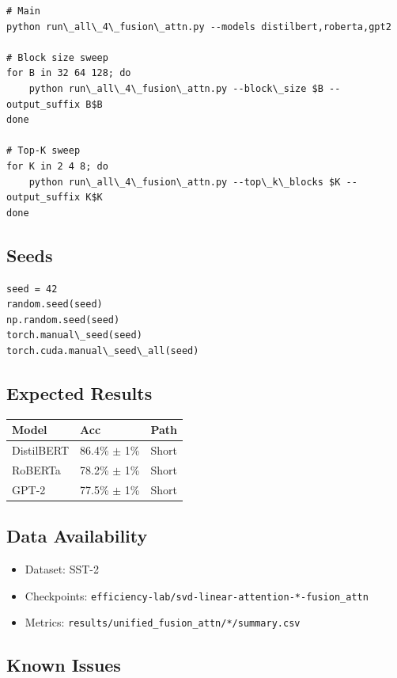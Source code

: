 \begin{lstlisting}
# Main
python run\_all\_4\_fusion\_attn.py --models distilbert,roberta,gpt2

# Block size sweep
for B in 32 64 128; do
    python run\_all\_4\_fusion\_attn.py --block\_size $B --output_suffix B$B
done

# Top-K sweep
for K in 2 4 8; do
    python run\_all\_4\_fusion\_attn.py --top\_k\_blocks $K --output_suffix K$K
done
\end{lstlisting}

\subsection{Seeds}

\begin{lstlisting}
seed = 42
random.seed(seed)
np.random.seed(seed)
torch.manual\_seed(seed)
torch.cuda.manual\_seed\_all(seed)
\end{lstlisting}

\subsection{Expected Results}

\begin{table}[H]
\centering
\small
\begin{tabular}{lll}
\toprule
\textbf{Model} & \textbf{Acc} & \textbf{Path} \\
\midrule
DistilBERT & 86.4\% $\pm$ 1\% & Short \\
RoBERTa & 78.2\% $\pm$ 1\% & Short \\
GPT-2 & 77.5\% $\pm$ 1\% & Short \\
\bottomrule
\end{tabular}
\end{table}

\subsection{Data Availability}

\begin{itemize}
\item Dataset: SST-2
\item Checkpoints: \texttt{efficiency-lab/svd-linear-attention-*-fusion\_attn}
\item Metrics: \texttt{results/unified\_fusion\_attn/*/summary.csv}

\end{itemize}
\subsection{Known Issues}

